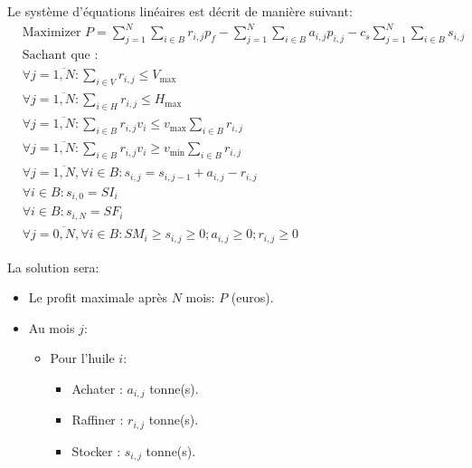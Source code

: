 \documentclass[10pt,a4paper]{article}
\begin{document}
Le système d'équations linéaires est décrit de manière suivant:
\begin{align*}
    & \text{Maximizer } P = \sum\limits_{j = 1}^N {\sum\limits_{i \in B}^{} {{r_{i,j}}p_f} }  - \sum\limits_{j = 1}^N {\sum\limits_{i \in B}^{} {{a_{i,j}}{p_{i,j}}} }  - {c_s}\sum\limits_{j = 1}^N {\sum\limits_{i \in B}^{} {{s_{i,j}}} }\\
    & \text{Sachant que : }\\
    & \forall j = \overline {1,N} :\sum\limits_{i \in V}^{} {{r_{i,j}}}  \le {V_{\max }}\\
    & \forall j = \overline {1,N} :\sum\limits_{i \in H}^{} {{r_{i,j}}}  \le {H_{\max }}\\
    & \forall j = \overline {1,N} :\sum\limits_{i \in B}^{} {{r_{i,j}}{v_i}}  \le {v_{\max }}\sum\limits_{i \in B}^{} {{r_{i,j}}} \\
    & \forall j = \overline {1,N} :\sum\limits_{i \in B}^{} {{r_{i,j}}{v_i}}  \ge {v_{\min }}\sum\limits_{i \in B}^{} {{r_{i,j}}} \\
    & \forall j = \overline {1,N} ,\forall i \in B:{s_{i,j}} = {s_{i,j - 1}} + {a_{i,j}} - {r_{i,j}}\\
    & \forall i \in B:{s_{i,0}} = S{I_i}\\
    & \forall i \in B:{s_{i,N}} = S{F_i}\\
    & \forall j = \overline {0,N} ,\forall i \in B:S{M_i} \ge {s_{i,j}} \ge 0;{a_{i,j}} \ge 0;{r_{i,j}} \ge 0
\end{align*}

La solution sera:
\begin{itemize}
    \item Le profit maximale après $N$ mois: $P$ (euros).
    \item Au mois $j$:
    \begin{itemize}
        \item Pour l'huile $i$:
        \begin{itemize}
            \item Achater : $a_{i,j}$ tonne(s).
            \item Raffiner : $r_{i,j}$ tonne(s).
            \item Stocker : $s_{i,j}$ tonne(s).
        \end{itemize}
    \end{itemize}
\end{itemize}
\end{document}
